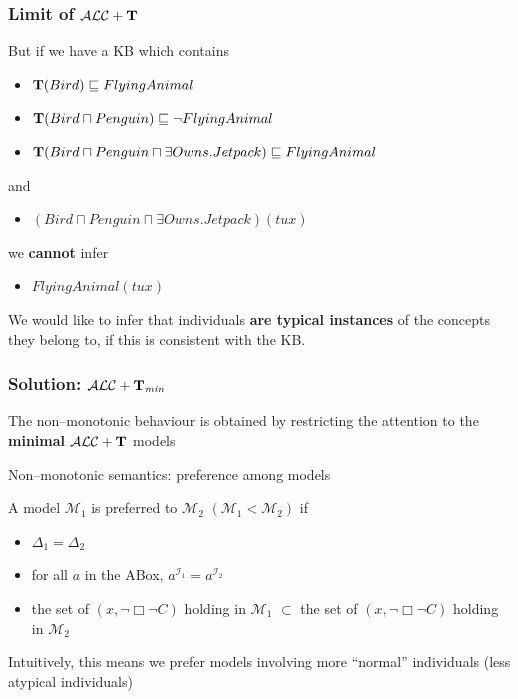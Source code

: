 \documentclass[serif,mathserif]{beamer}
\newcommand{\tip}{{\bf T}}
\newcommand{\alct}{\mathcal{ALC}+\tip}
\newcommand{\alctmin}{\mathcal{ALC}+\tip_{\mbox{\scriptsize \em min}}}
\begin{document}
\begin{frame}
	\frametitle{Limit of $\alct$}
	\begin{example}
	But if we have a KB which contains
		\begin{itemize}
		\item $\tip(Bird) \sqsubseteq FlyingAnimal$
		\item $\tip(Bird \sqcap Penguin) \sqsubseteq \neg FlyingAnimal$
		\item $\tip(Bird \sqcap Penguin \sqcap \exists Owns.Jetpack) \sqsubseteq FlyingAnimal$
		\end{itemize}
		and		
		\begin{itemize}
		\item \alert{$(Bird \sqcap Penguin \sqcap \exists Owns.Jetpack) (tux)$}
		\end{itemize}
		we \textbf{cannot} infer
		\begin{itemize}
		\item $FlyingAnimal(tux)$	
		\end{itemize}	
	\end{example}
	
	We would like to infer that individuals \textbf{are typical instances} of the concepts they belong to, if this is consistent with the KB.
\end{frame}


\begin{frame}
	\frametitle{Solution: $\alctmin$}
		The non--monotonic behaviour is obtained by restricting the attention to the \textbf{minimal} $\alct$ models
	\begin{block}{Non--monotonic semantics: preference among models}
	
	A model $\mathcal{M}_1$ is preferred to $\mathcal{M}_2$ $(\mathcal{M}_1 < \mathcal{M}_2)$ if
		\begin{itemize}
		\item $\Delta_1 = \Delta_2$	
		\item for all $a$ in the ABox, $a^{\mathcal{I}_1} = a^{\mathcal{I}_2}$
		\item the set of $(x, \neg\Box\neg C)$ holding in $\mathcal{M}_1$ $\subset$ the set of $(x, \neg\Box\neg C)$ holding in $\mathcal{M}_2$
		\end{itemize}
	\end{block}
	
	Intuitively, this means we prefer models involving more ``normal'' individuals (less atypical individuals)
\end{frame}
\end{document}
